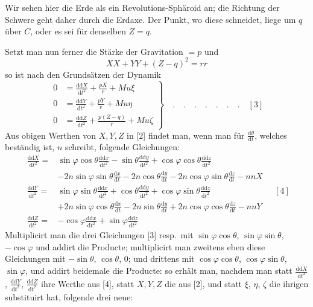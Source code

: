 Wir sehen hier die Erde als ein Revolutions-Sphäroid an; die Richtung der Schwere geht daher durch die Erdaxe. Der Punkt, wo diese schneidet, liege um $q$ über $C$, oder es sei für denselben $Z=q$.

Setzt man nun ferner die Stärke der Gravitation $=p$ und
\[
XX+YY+(Z-q)^2=rr
\]
so ist nach den Grundsätzen der Dynamik
\[
\left.\begin{aligned}
0&=\frac{\mathrm{dd}X}{\mathrm{d}t^2}+\frac{pX}{r}+Mu\xi\\
0&=\frac{\mathrm{dd}Y}{\mathrm{d}t^2}+\frac{pY}{r}+Mu\eta\\
0&=\frac{\mathrm{dd}Z}{\mathrm{d}t^2}+\frac{p(Z-q)}{r}+Mu\zeta
\end{aligned}\right\}\quad.\quad.\quad.\quad.\quad.\quad.\quad.\quad[3]
\]
Aus obigen Werthen von $X,Y,Z$ in [2] findet man, wenn man für $\tfrac{\mathrm{d}\theta}{\mathrm{d}t}$, welches beständig ist, $n$ schreibt, folgende Gleichungen:
\[
\begin{aligned}
\frac{\mathrm{dd}X}{\mathrm{d}t^2}={}&\sin\varphi\cos\theta\frac{\mathrm{dd}x}{\mathrm{d}t^2}-\sin\theta\frac{\mathrm{dd}y}{\mathrm{d}t^2}+\cos\varphi\cos\theta\frac{\mathrm{dd}z}{\mathrm{d}t^2}\\
&-2n\sin\varphi\sin\theta\frac{\mathrm{d}x}{\mathrm{d}t}-2n\cos\theta\frac{\mathrm{d}y}{\mathrm{d}t}-2n\cos\varphi\sin\theta\frac{\mathrm{d}z}{\mathrm{d}t}-nnX\\[5pt]
\frac{\mathrm{dd}Y}{\mathrm{d}t^2}={}&\sin\varphi\sin\theta\frac{\mathrm{dd}x}{\mathrm{d}t^2}+\cos\theta\frac{\mathrm{dd}y}{\mathrm{d}t^2}+\cos\varphi\sin\theta\frac{\mathrm{dd}z}{\mathrm{d}t^2}\\
&+2n\sin\varphi\cos\theta\frac{\mathrm{d}x}{\mathrm{d}t}-2n\sin\theta\frac{\mathrm{d}y}{\mathrm{d}t}+2n\cos\varphi\cos\theta\frac{\mathrm{d}z}{\mathrm{d}t}-nnY\\[5pt]
\frac{\mathrm{dd}Z}{\mathrm{d}t^2}={}&-\cos\varphi\frac{\mathrm{dd}x}{\mathrm{d}t^2}+\sin\varphi\frac{\mathrm{dd}z}{\mathrm{d}t^2}
\end{aligned}\quad[4]
\]
Multiplicirt man die drei Gleichungen [3] resp.\ mit $\sin\varphi\cos\theta$, $\sin\varphi\sin\theta$, $-\cos\varphi$ und addirt die Producte; multiplicirt man zweitens eben diese Gleichungen mit $-\sin\theta$, $\cos\theta$, $0$; und drittens mit $\cos\varphi\cos\theta$, $\cos\varphi\sin\theta$, $\sin\varphi$, und addirt beidemale die Producte: so erhält man, nachdem man statt $\tfrac{\mathrm{dd}X}{\mathrm{d}t^2}$, $\tfrac{\mathrm{dd}Y}{\mathrm{d}t^2}$, $\tfrac{\mathrm{dd}Z}{\mathrm{d}t^2}$ ihre Werthe aus [4], statt $X,Y,Z$ die aus [2], und statt $\xi$, $\eta$, $\zeta$ die ihrigen substituirt hat, folgende drei neue:
